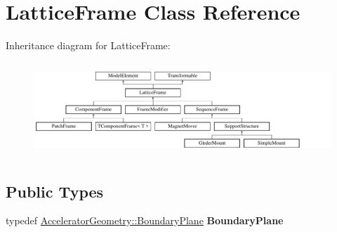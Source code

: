 \hypertarget{classLatticeFrame}{}\section{Lattice\+Frame Class Reference}
\label{classLatticeFrame}
Inheritance diagram for Lattice\+Frame\+:\begin{figure}[H]
\begin{center}
\leavevmode
\includegraphics[height=3.566879cm]{classLatticeFrame}
\end{center}
\end{figure}
\subsection*{Public Types}
\begin{DoxyCompactItemize}
\item 
\mbox{\label{classLatticeFrame_a86fcbbfc5418b03a9db1fc9f7b38731e}} 
typedef \hyperlink{classAcceleratorGeometry_a5c1661938176102f235836f5a8be6034}{Accelerator\+Geometry\+::\+Boundary\+Plane} {\bfseries Boundary\+Plane}
\end{DoxyCompactItemize}
